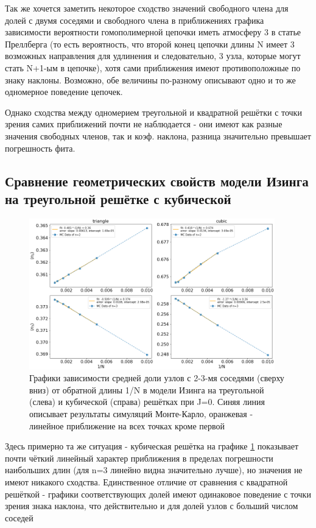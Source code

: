 Так же хочется заметить некоторое сходство значений свободного члена для долей с двумя соседями и свободного члена в приближениях графика зависимости вероятности гомополимерной цепочки иметь атмосферу 3 в статье Преллберга\cite{Prellberg} (то есть вероятность, что второй конец цепочки длины N имеет 3 возможных направления для удлинения и следовательно, 3 узла, которые могут стать N+1-ым в цепочке), хотя сами приближения имеют противоположные по знаку наклоны. Возможно, обе величины по-разному описывают одно и то же одномерное поведение цепочек.

Однако сходства между одномерием треугольной и квадратной решётки с точки зрения самих приближений почти не наблюдается - они имеют как разные значения свободных членов, так и коэф. наклона, разница значительно превышает погрешность фита. 

\subsection{Сравнение геометрических свойств модели Изинга на треугольной решётке с кубической}

\begin{figure}
    \centering
    \includegraphics[width=0.95\textwidth]{Sections/Images/triangle_vs_cubic_bulk.png}
    \caption{Графики зависимости средней доли узлов с 2-3-мя соседями (сверху вниз) от обратной длины 1/N в модели Изинга на треугольной (слева) и кубической (справа) решётках при J=0. Синяя линия описывает результаты симуляций Монте-Карло, оранжевая - линейное приближение на всех точках кроме первой}
    \label{fig:tr_vs_cb_bulk}
\end{figure}

Здесь примерно та же ситуация - кубическая решётка на графике \ref{fig:tr_vs_cb_bulk} показывает почти чёткий линейный характер приближения в пределах погрешности наибольших длин (для n=3 линейно видна значительно лучше), но значения не имеют никакого сходства. Единственное отличие от сравнения с квадратной решёткой - графики соответствующих долей имеют одинаковое поведение с точки зрения знака наклона, что действительно и для долей узлов с больший числом соседей